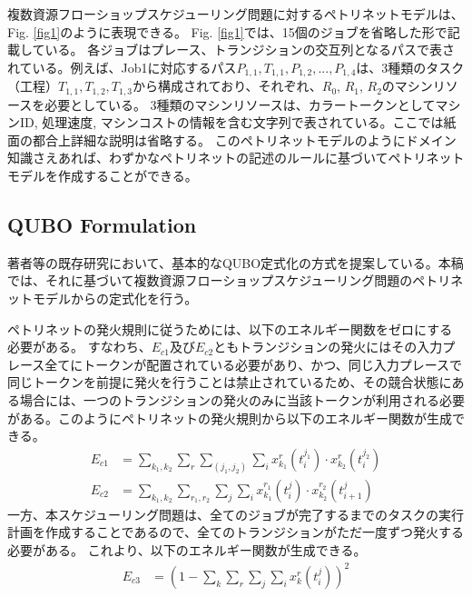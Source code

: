 \documentclass[conference]{IEEEtran}
\begin{document}
複数資源フローショップスケジューリング問題に対するペトリネットモデルは、Fig. \ref{fig1}のように表現できる。
Fig. \ref{fig1}では、15個のジョブを省略した形で記載している。
各ジョブはプレース、トランジションの交互列となるパスで表されている。例えば、Job1に対応するパス$P_{1,1}, T_{1,1}, P_{1,2}, ..., P_{1,4}$は、3種類のタスク（工程）$T_{1,1}, T_{1,2}, T_{1,3}$から構成されており、それぞれ、$R_0$, $R_1$, $R_2$のマシンリソースを必要としている。
3種類のマシンリソースは、カラートークンとしてマシンID, 処理速度, マシンコストの情報を含む文字列で表されている。ここでは紙面の都合上詳細な説明は省略する。
このペトリネットモデルのようにドメイン知識さえあれば、わずかなペトリネットの記述のルールに基づいてペトリネットモデルを作成することができる。


\subsection{QUBO Formulation}

著者等の既存研究\cite{shinjo}において、基本的なQUBO定式化の方式を提案している。本稿では、それに基づいて複数資源フローショップスケジューリング問題のペトリネットモデルからの定式化を行う。

ペトリネットの発火規則に従うためには、以下のエネルギー関数をゼロにする必要がある。
すなわち、$E_{c1}$及び$E_{c2}$ともトランジションの発火にはその入力プレース全てにトークンが配置されている必要があり、かつ、同じ入力プレースで同じトークンを前提に発火を行うことは禁止されているため、その競合状態にある場合には、一つのトランジションの発火のみに当該トークンが利用される必要がある。このようにペトリネットの発火規則から以下のエネルギー関数が生成できる。
\begin{align}
E_{c1} &= \sum_{k_1,k_2} \sum_r \sum_{(j_1,j_2)} \sum_i x_{k_1}^{r}(t_{i}^{j_1}) \cdot x_{k_2}^{r}(t_{i}^{j_2}) \label{eqn:presedence}\\
E_{c2} &= \sum_{k_1,k_2} \sum_{r_1,r_2} \sum_j \sum_i x_{k_1}^{r_1}(t_{i}^{j}) \cdot x_{k_2}^{r_2}(t_{i+1}^{j})  \label{eqn:conflict}
\end{align}
一方、本スケジューリング問題は、全てのジョブが完了するまでのタスクの実行計画を作成することであるので、全てのトランジションがただ一度ずつ発火する必要がある。
これより、以下のエネルギー関数が生成できる。
\begin{align}
E_{c3} &= ( 1 - \sum_k \sum_r \sum_j \sum_i x_{k}^{r}(t_{i}^{j}))^2  \label{eqn:allTasks}
\end{align}
\end{document}

